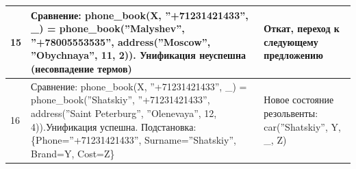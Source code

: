 \documentclass[12pt]{report}
\begin{document}
\begin{table}[H]
\begin{center}
\begin{tabular}{|p{1 cm}|p{12 cm}|p{6 cm}|}
			\hline
			15 & Сравнение: \newline phone\_book(X, ''+71231421433'', \_) = \newline phone\_book(''Malyshev'', ''+78005553535'', address(''Moscow'', ''Obychnaya'', 11, 2)). \newline Унификация неуспешна (несовпадение термов) & Откат, переход к следующему предложению \\
			\hline
			16 & Сравнение: \newline phone\_book(X, ''+71231421433'', \_) = \newline phone\_book(''Shatskiy'', ''+71231421433'', address(''Saint Peterburg'', ''Olenevaya'', 12, 4)).\newline Унификация успешна. \newline Подстановка: \{Phone=''+71231421433'', Surname=''Shatskiy'', Brand=Y, Cost=Z\} & Новое состояние резольвенты: \newline car(''Shatskiy'', Y, \_, Z) \\
			\hline
		\end{tabular}
	\end{center}
\end{table} 
\end{document}
